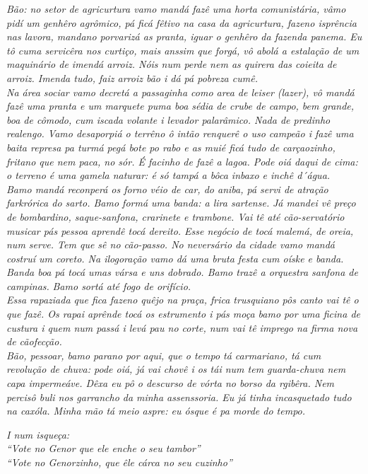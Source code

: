 \documentclass[12pt,brazil,]{book}
\begin{document}
\emph{Bão: no setor de agricurtura vamo mandá fazê uma horta
comunistária, vâmo pidí um genhêro agrômico, pá ficá fêtivo na casa da
agricurtura, fazeno isprência nas lavora, mandano porvarizá as pranta,
iguar o genhêro da fazenda panema. Eu tô cuma servicêra nos curtiço,
mais anssim que forgá, vô abolá a estalação de um maquinário de imendá
arroiz. Nóis num perde nem as quirera das coieita de arroiz. Imenda
tudo, faiz arroiz bão i dá pá pobreza cumê.}\\
\emph{Na área sociar vamo decretá a passaginha como area de leiser
(lazer), vô mandá fazê uma pranta e um marquete puma boa sédia de crube
de campo, bem grande, boa de cômodo, cum iscada volante i levador
palarâmico. Nada de predinho realengo. Vamo desaporpiá o terrêno ô intão
renquerê o uso campeão i fazê uma baita represa pa turmá pegá bote po
rabo e as muié ficá tudo de carçaozinho, fritano que nem paca, no sór. É
facinho de fazê a lagoa. Pode oiá daqui de cima: o terreno é uma gamela
naturar: é só tampá a bôca inbaxo e inchê d´água.}\\
\emph{Bamo mandá reconperá os forno véio de car, do aniba, pá servi de
atração farkrórica do sarto. Bamo formá uma banda: a lira sartense.}
\emph{Já mandei vê preço de bombardino, saque-sanfona, crarinete e
trambone. Vai tê até cão-servatório musicar pás pessoa aprendê tocá
dereito. Esse negócio de tocá malemá, de oreia, num serve. Tem que sê no
cão-passo. No neversário da cidade vamo mandá costruí um coreto. Na
ilogoração vamo dá uma bruta festa cum oíske e banda. Banda boa pá tocá
umas vársa e uns dobrado. Bamo trazê a orquestra sanfona de campinas.}
\emph{Bamo sortá até fogo de orifício.}\\
\emph{Essa rapaziada que fica fazeno quêjo na praça, frica trusquiano
pôs canto vai tê o que fazê. Os rapai aprênde tocá os estrumento i pás
moça bamo por uma ficina de custura i quem num passá i levá pau no
corte, num vai tê imprego na firma nova de cãofecção.}\\
\emph{Bão, pessoar, bamo parano por aqui, que o tempo tá carmariano, tá
cum revolução de chuva: pode oiá, já vai chovê i os tái num tem
guarda-chuva nem capa impermeáve. Dêxa eu pô o descurso de vórta no
borso da rgibêra. Nem percisô buli nos garrancho da minha assenssoria.
Eu já tinha incasquetado tudo na caxóla. Minha mão tá meio aspre: eu
ósque é pa morde do tempo.}

\emph{I num isqueça:}\\
\emph{\emph{``Vote no Genor que ele enche o seu tambor''}}\\
\emph{\emph{``Vote no Genorzinho, que êle cárca no seu cuzinho''}}
\end{document}
